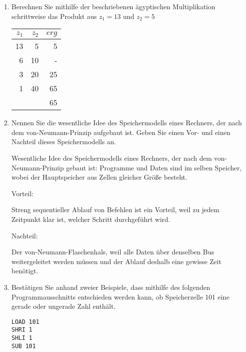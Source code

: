 \documentclass{lehramt-informatik-aufgabe}
\begin{document}
\begin{enumerate}


\item Berechnen Sie mithilfe der beschriebenen ägyptischen
Multiplikation schrittweise das Produkt aus $z_1 = 13$ und $z_2 = 5$

\begin{liAntwort}
\begin{tabular}{rrr}
$z_1$ & $z_2$ & $erg$ \\\hline
13 & 5  & 5   \\
6  & 10 & -   \\
3  & 20 & 25  \\
1  & 40 & 65  \\\hline
  &     & 65  \\
\end{tabular}
\end{liAntwort}


\item Nennen Sie die wesentliche Idee des Speichermodells eines
Rechners, der nach dem von-Neumann-Prinzip aufgebaut ist. Geben Sie
einen Vor- und einen Nachteil dieses Speichermodells an.

\begin{liAntwort}
Wesentliche Idee des Speichermodells eines Rechners, der nach dem
von-Neumann-Prinzip gebaut ist: Programme und Daten sind im selben
Speicher, wobei der Hauptspeicher aus Zellen gleicher Größe besteht.

Vorteil:

Streng sequentieller Ablauf von Befehlen ist ein Vorteil, weil zu jedem
Zeitpunkt klar ist, welcher Schritt durchgeführt wird.

Nachteil:

Der von-Neumann-Flaschenhals, weil alle Daten über denselben Bus
weitergeleitet werden müssen und der Ablauf deshalb eine gewisse Zeit
benötigt.
\end{liAntwort}


\item Bestätigen Sie anhand zweier Beispiele, dass mithilfe des
folgenden Programmausschnitts entschieden werden kann, ob
Speicherzelle 101 eine gerade oder ungerade Zahl enthält.

\begin{verbatim}
LOAD 101
SHRI 1
SHLI 1
SUB 101
\end{verbatim}


\end{enumerate}
\end{document}
